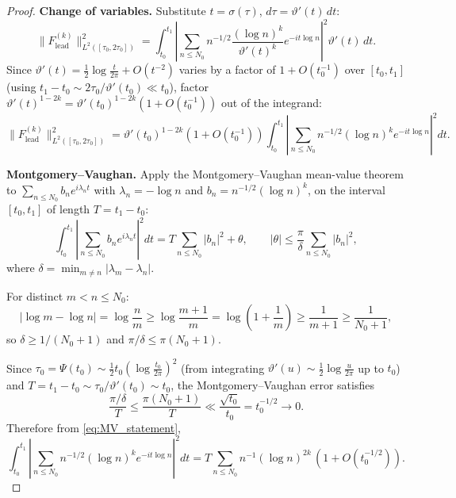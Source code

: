 \documentclass[11pt]{article}
\theoremstyle{definition}
\begin{document}
\begin{proof}
\textbf{Change of variables.}
Substitute $t=\sigma(\tau)$, $d\tau=\vartheta'(t)\,dt$:
\begin{equation}\label{eq:CHANGE}
\|F^{(k)}_{\mathrm{lead}}\|_{L^2([\tau_0,2\tau_0])}^2
=\int_{t_0}^{t_1}
\left|\sum_{n\le N_0}n^{-1/2}\frac{(\log n)^k}{\vartheta'(t)^k}
e^{-it\log n}\right|^2\vartheta'(t)\,dt.
\end{equation}
Since $\vartheta'(t)=\tfrac12\log\tfrac{t}{2\pi}+O(t^{-2})$
varies by a factor of $1+O(t_0^{-1})$ over $[t_0,t_1]$ (using
$t_1-t_0\sim 2\tau_0/\vartheta'(t_0)\ll t_0$), factor
$\vartheta'(t)^{1-2k}=\vartheta'(t_0)^{1-2k}(1+O(t_0^{-1}))$ out of
the integrand:
\begin{equation}\label{eq:CHANGE2}
\|F^{(k)}_{\mathrm{lead}}\|_{L^2([\tau_0,2\tau_0])}^2
=\vartheta'(t_0)^{1-2k}(1+O(t_0^{-1}))
\int_{t_0}^{t_1}
\left|\sum_{n\le N_0}n^{-1/2}(\log n)^k e^{-it\log n}\right|^2 dt.
\end{equation}

\textbf{Montgomery--Vaughan.}
Apply the Montgomery--Vaughan mean-value theorem
to $\sum_{n\le N_0}b_n e^{i\lambda_n t}$ with
$\lambda_n=-\log n$ and $b_n=n^{-1/2}(\log n)^k$,
on the interval $[t_0,t_1]$ of length $T=t_1-t_0$:
\begin{equation}\label{eq:MV_statement}
\int_{t_0}^{t_1}\left|\sum_{n\le N_0}b_n e^{i\lambda_n t}\right|^2 dt
=T\sum_{n\le N_0}|b_n|^2+\theta,
\qquad|\theta|\le\frac{\pi}{\delta}\sum_{n\le N_0}|b_n|^2,
\end{equation}
where $\delta=\min_{m\ne n}|\lambda_m-\lambda_n|$.

For distinct $m<n\le N_0$:
\[
|\log m-\log n|=\log\frac{n}{m}
\ge\log\frac{m+1}{m}=\log\!\left(1+\frac{1}{m}\right)\ge\frac{1}{m+1}
\ge\frac{1}{N_0+1},
\]
so $\delta\ge 1/(N_0+1)$ and $\pi/\delta\le\pi(N_0+1)$.

Since $\tau_0=\Psi(t_0)\sim\tfrac12 t_0(\log\tfrac{t_0}{2\pi})^2$
(from integrating $\vartheta'(u)\sim\tfrac12\log\tfrac{u}{2\pi}$ up to
$t_0$) and $T=t_1-t_0\sim\tau_0/\vartheta'(t_0)\sim t_0$, the
Montgomery--Vaughan error satisfies
\[
\frac{\pi/\delta}{T}\le\frac{\pi(N_0+1)}{T}
\ll\frac{\sqrt{t_0}}{t_0}=t_0^{-1/2}\to 0.
\]
Therefore from \eqref{eq:MV_statement},
\begin{equation}\label{eq:MV_applied}
\int_{t_0}^{t_1}
\left|\sum_{n\le N_0}n^{-1/2}(\log n)^k e^{-it\log n}\right|^2 dt
=T\sum_{n\le N_0}n^{-1}(\log n)^{2k}\,(1+O(t_0^{-1/2})).
\end{equation}


\end{proof}
\end{document}
